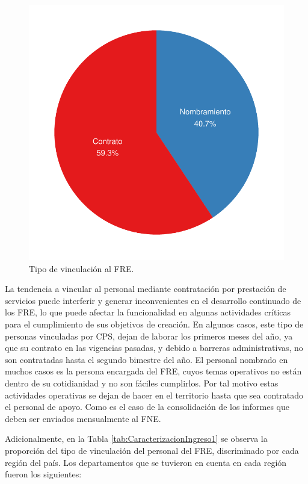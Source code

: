 \documentclass[
  oneside]{book}
\begin{document}
\begin{figure}[t]

{\centering \includegraphics[width=0.85\linewidth]{InformeFinal_files/figure-latex/pieProfesional2-1} 

}

\caption{Tipo de vinculación al FRE.}\label{fig:pieProfesional2}
\end{figure}

La tendencia a vincular al personal mediante contratación por prestación de servicios puede interferir y generar inconvenientes en el desarrollo continuado de los FRE, lo que puede afectar la funcionalidad en algunas actividades críticas para el cumplimiento de sus objetivos de creación. En algunos casos, este tipo de personas vinculadas por CPS, dejan de laborar los primeros meses del año, ya que su contrato en las vigencias pasadas, y debido a barreras administrativas, no son contratadas hasta el segundo bimestre del año. El personal nombrado en muchos casos es la persona encargada del FRE, cuyos temas operativos no están dentro de su cotidianidad y no son fáciles cumplirlos. Por tal motivo estas actividades operativas se dejan de hacer en el territorio hasta que sea contratado el personal de apoyo. Como es el caso de la consolidación de los informes que deben ser enviados mensualmente al FNE.

Adicionalmente, en la Tabla \ref{tab:CaracterizacionIngreso1} se observa la proporción del tipo de vinculación del personal del FRE, discriminado por cada región del país. Los departamentos que se tuvieron en cuenta en cada región fueron los siguientes:
\end{document}
